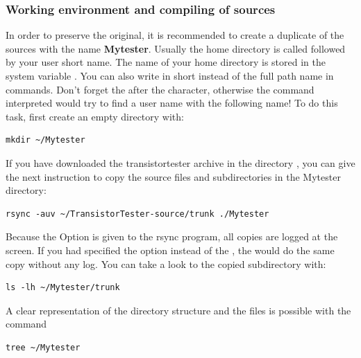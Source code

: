 \subsubsection{Working environment and compiling of sources}
\label{sec:Arbeitsumgebung}
In order to preserve the original, it is recommended to create a duplicate
of the sources with the name \textbf{Mytester}.
Usually the home directory is called  followed by your user short name.
The name of your home directory is stored in the system variable .
You can also write \lname{\textasciitilde/} in short instead of the full path name in commands. 
Don't forget the \lname{/} after the \lname{\textasciitilde} character, otherwise the command
interpreted would try to find a user name with the following name!
To do this task, first create an empty directory with: 
\begin{large} \vspace{-0.4em} \begin{verbatim}
mkdir ~/Mytester
\end{verbatim} \end{large}
If you have downloaded the transistortester archive in the directory ,
you can give the next instruction to copy the source files and subdirectories
in the Mytester directory:
\begin{large} \vspace{-0.4em} \begin{verbatim}
rsync -auv ~/TransistorTester-source/trunk ./Mytester
\end{verbatim} \end{large}
Because the  Option is given to the rsync program, all
copies are logged at the screen.
If you had specified the  option instead of the ,
the  would do the same copy without any log.
You can take a look to the copied subdirectory with:
\begin{large} \vspace{-0.4em} \begin{verbatim}
ls -lh ~/Mytester/trunk
\end{verbatim} \end{large}
A clear representation of the directory structure and the files is possible with the command
\begin{large} \vspace{-0.4em} \begin{verbatim}
tree ~/Mytester
\end{verbatim} \end{large}
